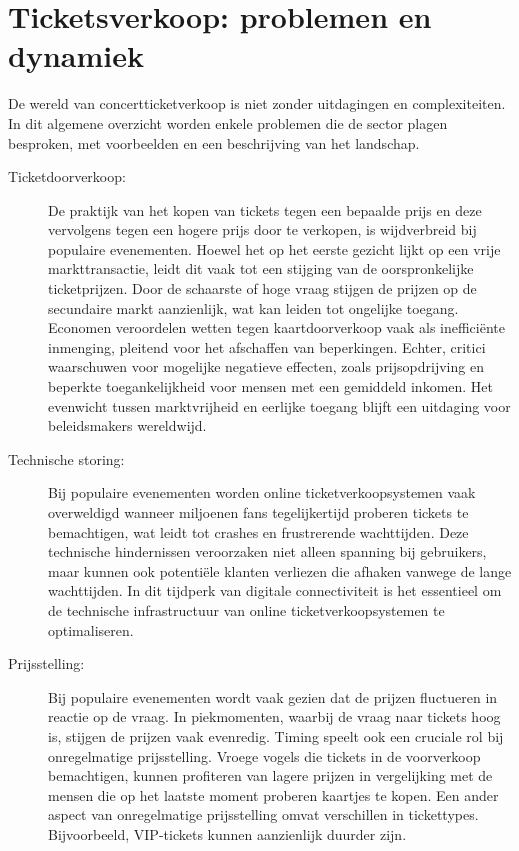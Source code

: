 \section{Ticketsverkoop: problemen en dynamiek}

De wereld van concertticketverkoop is niet zonder uitdagingen en complexiteiten. In dit algemene overzicht worden enkele problemen die de sector plagen besproken, met voorbeelden en een beschrijving van het landschap. \newline 

\begin{description}
    \item[Ticketdoorverkoop:] De praktijk van het kopen van tickets tegen een bepaalde prijs en deze vervolgens tegen een hogere prijs door te verkopen, is wijdverbreid bij populaire evenementen. Hoewel het op het eerste gezicht lijkt op een vrije markttransactie, leidt dit vaak tot een stijging van de oorspronkelijke ticketprijzen. Door de schaarste of hoge vraag stijgen de prijzen op de secundaire markt aanzienlijk, wat kan leiden tot ongelijke toegang. Economen veroordelen wetten tegen kaartdoorverkoop vaak als inefficiënte inmenging, pleitend voor het afschaffen van beperkingen. Echter, critici waarschuwen voor mogelijke negatieve effecten, zoals prijsopdrijving en beperkte toegankelijkheid voor mensen met een gemiddeld inkomen. Het evenwicht tussen marktvrijheid en eerlijke toegang blijft een uitdaging voor beleidsmakers wereldwijd.
    \item[Technische storing:] Bij populaire evenementen worden online ticketverkoopsystemen vaak overweldigd wanneer miljoenen fans tegelijkertijd proberen tickets te bemachtigen, wat leidt tot crashes en frustrerende wachttijden. Deze technische hindernissen veroorzaken niet alleen spanning bij gebruikers, maar kunnen ook potentiële klanten verliezen die afhaken vanwege de lange wachttijden. In dit tijdperk van digitale connectiviteit is het essentieel om de technische infrastructuur van online ticketverkoopsystemen te optimaliseren.
    \item[Prijsstelling:] Bij populaire evenementen wordt vaak gezien dat de prijzen fluctueren in reactie op de vraag. In piekmomenten, waarbij de vraag naar tickets hoog is, stijgen de prijzen vaak evenredig. Timing speelt ook een cruciale rol bij onregelmatige prijsstelling. Vroege vogels die tickets in de voorverkoop bemachtigen, kunnen profiteren van lagere prijzen in vergelijking met de mensen die op het laatste moment proberen kaartjes te kopen. Een ander aspect van onregelmatige prijsstelling omvat verschillen in tickettypes. Bijvoorbeeld, VIP-tickets kunnen aanzienlijk duurder zijn.

\end{description}
